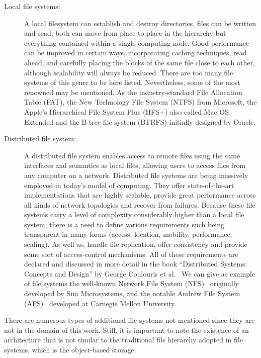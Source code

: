 \begin{description}
	\item [Local file systems:] A local filesystem can establish and destroy directories, files can be written and read, both can move from place to place in the hierarchy but everything contained within a single computing node. 
		Good performance can be improved in certain ways, incorporating caching techniques, read ahead, and carefully placing the blocks of the same file close to each other, although scalability will always be reduced. 
		There are too many file systems of this genre to be here listed. Nevertheless, some of the most renowned may be mentioned. As the industry-standard File Allocation Table (FAT), the New Technology File System (NTFS) from Microsoft, the Apple's Hierarchical File System Plus (HFS+) also called Mac OS Extended and the B-tree file system (BTRFS) initially designed by Oracle.
	\item [Distributed file system:] A distributed file system enables access to remote files using the same interfaces and semantics as local files, allowing users to access files from any computer on a network. 
		Distributed file systems are being massively employed in today's model of computing. They offer state-of-the-art implementations that are highly scalable, provide great performance across all kinds of network topologies and recover from failures. 
		Because these file systems carry a level of complexity considerably higher than a local file system, there is a need to define various requirements such being transparent in many forms (access, location, mobility, performance, scaling). As well as, handle file replication, offer consistency and provide some sort of access-control mechanisms. 
		All of these requirements are declared and discussed in more detail in the book \enquote{Distributed Systems: Concepts and Design} by George Coulouris et al.~\cite{Coulouris2011}
		We can give as example of file systems the well-known Network File System (NFS)~\cite{rfc5661} originally developed by Sun Microsystems, and the notable Andrew File System (AFS)~\cite{Satyanarayanan1990} developed at Carnegie Mellon University.
\end{description}

There are numerous types of additional file systems not mentioned since they are not in the domain of this work. Still, it is important to note the existence of an architecture that is not similar to the traditional file hierarchy adopted in file systems, which is the object-based storage. 

